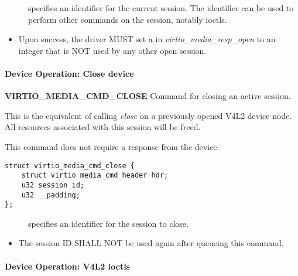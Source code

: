 \begin{description}
\item[] specifies an identifier for the current session. The
identifier can be used to perform other commands on the session, notably ioctls.
\end{description}


\begin{itemize}
\item Upon success, the driver MUST set a  in \textit{virtio_media_resp_open}
to an integer that is NOT used by any other open session.
\end{itemize}

\paragraph{Device Operation: Close device}

\textbf{VIRTIO_MEDIA_CMD_CLOSE} Command for closing an active session.

This is the equivalent of calling \textit{close} on a previously opened V4L2
device node. All resources associated with this session will be freed.

This command does not require a response from the device.

\begin{lstlisting}
struct virtio_media_cmd_close {
    struct virtio_media_cmd_header hdr;
    u32 session_id;
    u32 __padding;
};
\end{lstlisting}

\begin{description}
\item[] specifies an identifier for the session to close.
\end{description}


\begin{itemize}
\item The session ID SHALL NOT be used again after queueing this command.
\end{itemize}

\paragraph{Device Operation: V4L2 ioctls}

